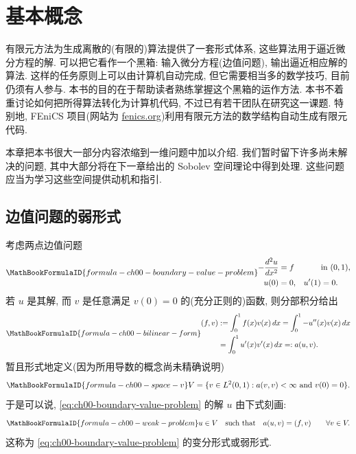 \section{基本概念}
\label{chap:ch00-basic-concepts}

有限元方法为生成离散的(有限的)算法提供了一套形式体系, 这些算法用于逼近微分方程的解. 可以把它看作一个黑箱: 输入微分方程(边值问题), 输出逼近相应解的算法. 这样的任务原则上可以由计算机自动完成, 但它需要相当多的数学技巧, 目前仍须有人参与. 本书的目的在于帮助读者熟练掌握这个黑箱的运作方法. 本书不着重讨论如何把所得算法转化为计算机代码, 不过已有若干团队在研究这一课题. 特别地, FEniCS 项目(网站为 \url{fenics.org})利用有限元方法的数学结构自动生成有限元代码.

本章把本书很大一部分内容浓缩到一维问题中加以介绍. 我们暂时留下许多尚未解决的问题, 其中大部分将在下一章给出的 Sobolev 空间理论中得到处理. 这些问题应当为学习这些空间提供动机和指引.

\subsection{边值问题的弱形式}
\label{sec:ch00-weak-formulation}

考虑两点边值问题
\setcounter{equation}{0}
\begin{equation}
\MathBookFormulaID{formula-ch00-boundary-value-problem}
\begin{aligned}
-\frac{d^2u}{dx^2}&=f &&\text{in }(0,1),\\
u(0)&=0, & u'(1)&=0.
\end{aligned}
\label{eq:ch00-boundary-value-problem}
\end{equation}
若 $u$ 是其解, 而 $v$ 是任意满足 $v(0)=0$ 的(充分正则的)函数, 则分部积分给出
\begin{equation}
\MathBookFormulaID{formula-ch00-bilinear-form}
\begin{aligned}
(f,v)&:=\int_0^1 f(x)v(x)\,dx
=\int_0^1-u''(x)v(x)\,dx\\
&=\int_0^1u'(x)v'(x)\,dx=:a(u,v).
\end{aligned}
\label{eq:ch00-bilinear-form}
\end{equation}
暂且形式地定义(因为所用导数的概念尚未精确说明)
\[
\MathBookFormulaID{formula-ch00-space-v}
V=\{v\in L^2(0,1):a(v,v)<\infty\text{ and }v(0)=0\}.
\]
于是可以说, \eqref{eq:ch00-boundary-value-problem} 的解 $u$ 由下式刻画:
\begin{equation}
\MathBookFormulaID{formula-ch00-weak-problem}
u\in V\quad\text{such that}\quad a(u,v)=(f,v)\qquad\forall v\in V.
\label{eq:ch00-weak-problem}
\end{equation}
这称为 \eqref{eq:ch00-boundary-value-problem} 的变分形式或弱形式.

